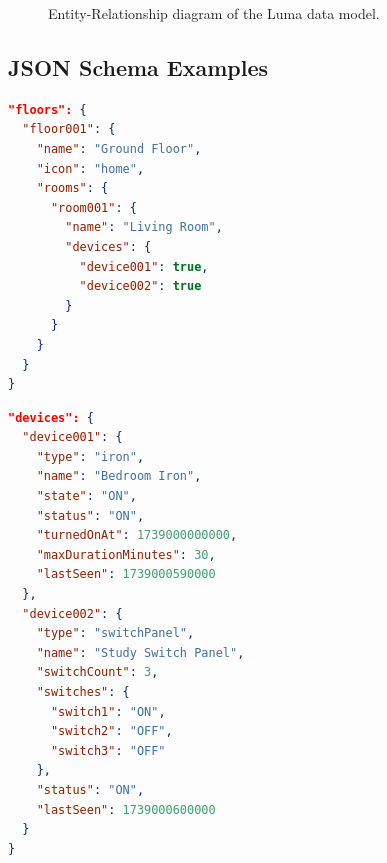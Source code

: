 \documentclass[11pt,a4paper]{article}
\begin{document}
\begin{figure}[H]
\centering
{}
\caption{Entity-Relationship diagram of the Luma data model.}
\label{fig:er-diagram}
\end{figure}

\subsection{JSON Schema Examples}

\begin{lstlisting}[language=json,caption={Example JSON structure for a single floor with one room and a device reference.},label={lst:json-floor}]
"floors": {
  "floor001": {
    "name": "Ground Floor",
    "icon": "home",
    "rooms": {
      "room001": {
        "name": "Living Room",
        "devices": {
          "device001": true,
          "device002": true
        }
      }
    }
  }
}
\end{lstlisting}

\begin{lstlisting}[language=json,caption={Example JSON structure for devices, including an Electric Iron and a Multi-Switch Panel.},label={lst:json-devices}]
"devices": {
  "device001": {
    "type": "iron",
    "name": "Bedroom Iron",
    "state": "ON",
    "status": "ON",
    "turnedOnAt": 1739000000000,
    "maxDurationMinutes": 30,
    "lastSeen": 1739000590000
  },
  "device002": {
    "type": "switchPanel",
    "name": "Study Switch Panel",
    "switchCount": 3,
    "switches": {
      "switch1": "ON",
      "switch2": "OFF",
      "switch3": "OFF"
    },
    "status": "ON",
    "lastSeen": 1739000600000
  }
}
\end{lstlisting}
\end{document}
